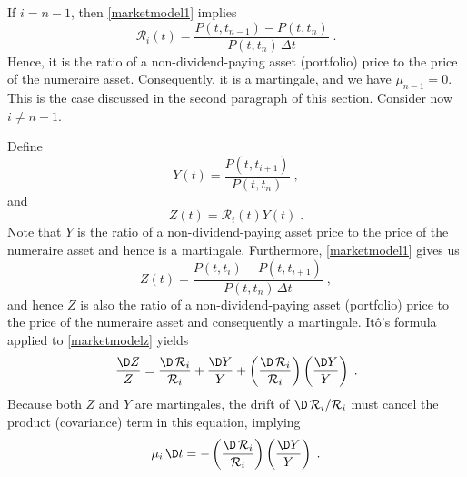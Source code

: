 If $i = n-1$, then \eqref{marketmodel1} implies
$$\mathcal{R}_i(t) = \frac{P(t,t_{n-1})-P(t,t_n)}{P(t,t_n)\,\varDelta t}\; .$$
Hence, it is the ratio of a non-dividend-paying asset (portfolio) price to the price of the numeraire asset.  Consequently, it is a martingale, and we have $\mu_{n-1}=0$.  This is the case discussed in the second paragraph of this section.  Consider now $i \neq n-1$.

Define
\begin{equation}\label{marketmodely}
Y(t) = \frac{P(t,t_{i+1})}{P(t,t_n)}\;,
\end{equation}
and
\begin{equation}\label{marketmodelz}
Z(t) = \mathcal{R}_i(t)Y(t)\;.
\end{equation}
Note that $Y$ is the ratio of a non-dividend-paying asset price to the price of the numeraire asset and hence is a martingale.  Furthermore,  \eqref{marketmodel1} gives us
$$ Z(t) = \frac{P(t,t_{i})-P(t,t_{i+1})}{P(t,t_n)\,\varDelta t}\; ,$$
and hence $Z$ is also the ratio of a non-dividend-paying asset (portfolio) price to the price of the numeraire asset and consequently a martingale.  
It\^o's formula applied to \eqref{marketmodelz} yields
$$\frac{\D Z}{Z} = \frac{\D \,\mathcal{R}_i}{\mathcal{R}_i} + \frac{\D Y}{Y} + \left( \frac{\D \,\mathcal{R}_i}{\mathcal{R}_i}\right)\left(\frac{\D Y}{Y}\right)\; .$$
Because both $Z$ and $Y$ are martingales, the drift of $\D \,\mathcal{R}_i/\mathcal{R}_i$ must cancel the product (covariance) term in this equation, implying
\begin{equation}\label{marketmodel4}
\mu_i\,\D t = - \left( \frac{\D \,\mathcal{R}_i}{\mathcal{R}_i}\right)\left(\frac{\D Y}{Y}\right)\;.
\end{equation}

